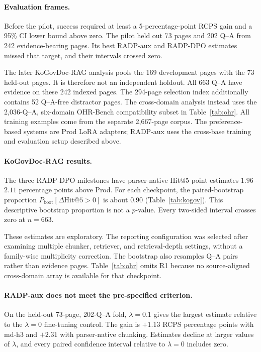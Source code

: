 \documentclass[11pt]{article}
\newcommand{\rcps}{\textnormal{\textsc{RCPS}}}
\begin{document}
\paragraph{Evaluation frames.} Before the pilot, success required at least a 5-percentage-point \rcps{} gain and a 95\% CI lower bound above zero. The pilot held out 73 pages and 202 Q--A from 242 evidence-bearing pages. Its best RADP-aux and RADP-DPO estimates missed that target, and their intervals crossed zero.

The later KoGovDoc-RAG analysis pools the 169 development pages with the 73 held-out pages. It is therefore not an independent holdout. All 663 Q--A have evidence on these 242 indexed pages. The 294-page selection index additionally contains 52 Q--A-free distractor pages. The cross-domain analysis instead uses the 2{,}036-Q--A, six-domain OHR-Bench compatibility subset in Table~\ref{tab:ohr}. All training examples come from the separate 2{,}667-page corpus. The preference-based systems are Prod LoRA adapters; RADP-aux uses the cross-base training and evaluation setup described above.

\paragraph{KoGovDoc-RAG results.} The three RADP-DPO milestones have parser-native Hit@5 point estimates $1.96$--$2.11$ percentage points above Prod. For each checkpoint, the paired-bootstrap proportion $P_\text{boot}[\Delta\mathrm{Hit@5}>0]$ is about $0.90$ (Table~\ref{tab:kogov}). This descriptive bootstrap proportion is not a $p$-value. Every two-sided interval crosses zero at $n=663$.

These estimates are exploratory. The reporting configuration was selected after examining multiple chunker, retriever, and retrieval-depth settings, without a family-wise multiplicity correction. The bootstrap also resamples Q--A pairs rather than evidence pages. Table~\ref{tab:ohr} omits R1 because no source-aligned cross-domain array is available for that checkpoint.

\paragraph{RADP-aux does not meet the pre-specified criterion.} On the held-out 73-page, 202-Q--A fold, $\lambda=0.1$ gives the largest estimate relative to the $\lambda=0$ fine-tuning control. The gain is $+1.13$ \rcps{} percentage points with md-h3 and $+2.31$ with parser-native chunking. Estimates decline at larger values of $\lambda$, and every paired confidence interval relative to $\lambda=0$ includes zero.
\end{document}

